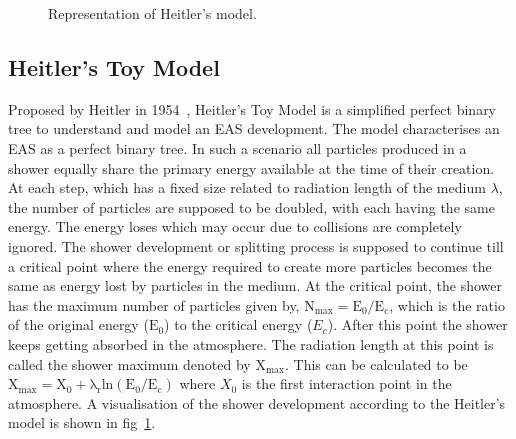 \begin{figure}[t!]
    \centering
    \hfill
    \caption{Representation of Heitler's model.}
    \label{fig:EAS_toy_model}
\end{figure}

\subsection{Heitler's Toy Model}
\label{sec:Dev_Heitler}

Proposed by Heitler in 1954~\cite{heitler1984quantum}, Heitler's Toy Model is a simplified perfect binary tree to understand and model an EAS development. The model characterises an EAS as a perfect binary tree. In such a scenario all particles produced in a shower equally share the primary energy available at the time of their creation. At each step, which has a fixed size related to radiation length of the medium $\lambda$, the number of particles are supposed to be doubled, with each having the same energy. The energy loses which may occur due to collisions are completely ignored. The shower development or splitting process is supposed to continue till a critical point where the energy required to create more particles becomes the same as energy lost by particles in the medium. At the critical point, the shower has the maximum number of particles given by, $\mathrm{N_{max} = E_0/E_c}$, which is the ratio of the original energy ($\mathrm{E_0}$) to the critical energy ($E_c$). After this point the shower keeps getting absorbed in the atmosphere. The radiation length at this point is called the shower maximum denoted by $\mathrm{X_{max}}$. This can be calculated to be $\mathrm{X_{max} = X_0 + \lambda_r ln(E_0/E_c)}$ where $X_0$ is the first interaction point in the atmosphere. A visualisation of the shower development according to the Heitler's model is shown in fig~\ref{fig:EAS_toy_model}.

